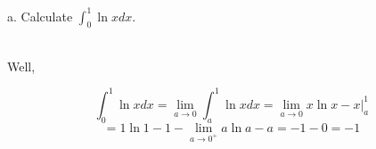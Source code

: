 a. Calculate $\int_0^1\ln xdx$.\\

\begin{solution}\renewcommand{\qedsymbol}{}\ \\
    Well,
    
    $$\int_0^1\ln xdx=\lim_{a\to0}\int_a^1\ln xdx=\lim_{a\to0}x\ln x-x|_a^1$$
    $$=1\ln1-1-\lim_{a\to0^+}a\ln a-a=-1-0=-1$$

\end{solution}